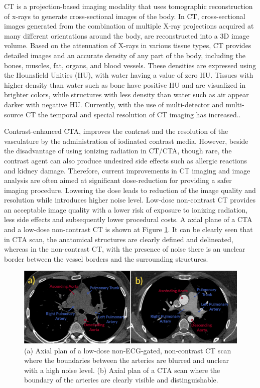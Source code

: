 CT is a projection-based imaging modality that uses tomographic reconstruction of x-rays to generate cross-sectional images of the body. In CT, cross-sectional images generated from the combination of multiple X-ray projections acquired at many different orientations around the body, are reconstructed into a 3D image volume. Based on the attenuation of X-rays in various tissue types, CT provides detailed images and an accurate density of any part of the body, including the bones, muscles, fat, organs, and blood vessels. These densities are expressed using the Hounsfield Unities (HU), with water having a value of zero HU. Tissues with higher density than water such as bone have positive HU and are visualized in brighter colors, while structures with less density than water such as air appear darker with negative HU. Currently, with the use of multi-detector and multi-source CT the temporal and special resolution of CT imaging has increased.\autocite{raman2013ct}. 

Contrast-enhanced \gls{CTA}, improves the contrast and the resolution of the vasculature by the administration of iodinated contrast media. 
However, beside the disadvantage of using ionizing radiation in \gls{CT}/\gls{CTA}, though rare, the contrast agent can also produce undesired side effects such as allergic reactions and kidney damage. 
Therefore, current improvements in CT imaging and image analysis are often aimed at significant dose-reduction for providing a safer imaging procedure\autocite{raman2013dosereduction}. Lowering the dose leads to reduction of the image quality and resolution while introduces higher noise level. Low-dose non-contrast CT provides an acceptable image quality with a lower risk of exposure to ionizing radiation, less side effects and subsequently lower procedural costs. A axial plane of a CTA and a low-dose non-contrast CT is shown at Figure \cref{fig:CT_CTA}. It can be clearly seen that in CTA scan, the anatomical structures are clearly defined and delineated, whereas in the non-contrast CT, with the presence of noise there is an unclear border between the vessel borders and the surrounding structures.

\begin{figure}[hbt]
    \centering
    \includegraphics[width=1\textwidth]{Figures/Scans_CT_CTA.png}
    \caption{(a) Axial plan of a low-dose non-ECG-gated, non-contrast CT scan where the boundaries between the arteries are blurred and unclear with a high noise level. (b) Axial plan of a CTA scan where the boundary of the arteries are clearly visible and distinguishable.}\label{fig:CT_CTA}
\end{figure} 


